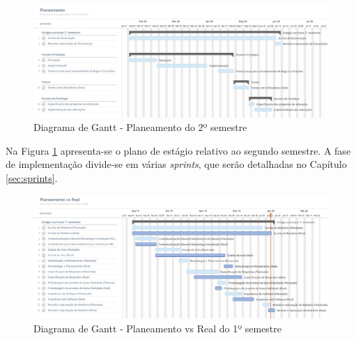 \begin{figure}[ht!]
	\begin{center}
		\includegraphics[width=1\textwidth]{img/gantt/semestre2.jpeg}
		\caption{Diagrama de Gantt - Planeamento do 2º semestre}
		\label{fig:gantt2}
	\end{center}
\end{figure}

Na Figura \ref{fig:gantt2} apresenta-se o plano de estágio relativo ao segundo semestre. A fase de implementação divide-se em várias \textit{sprints}, que serão detalhadas no Capítulo \ref{sec:sprints}.

\newpage

\begin{figure}[ht!]
	\begin{center}
		\includegraphics[width=1\textwidth]{img/gantt/vs.jpeg}
		\caption{Diagrama de Gantt - Planeamento vs Real do 1º semestre}
		\label{fig:ganttvs1}
	\end{center}
\end{figure}

